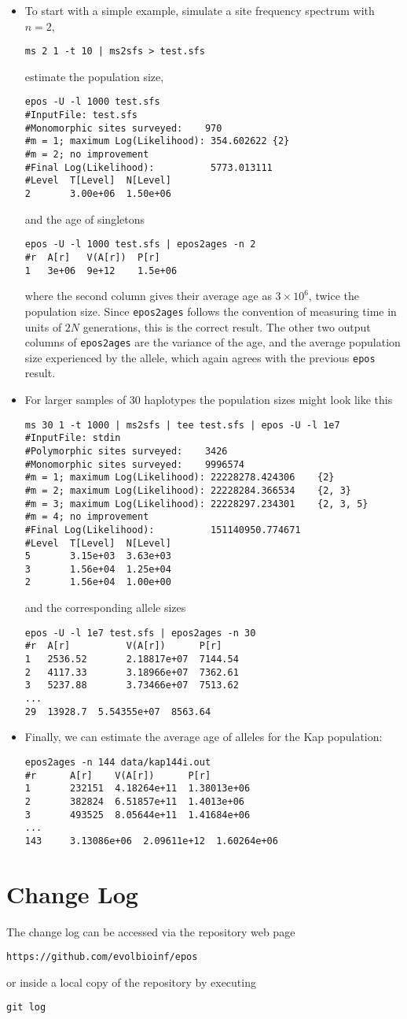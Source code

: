 \documentclass[a4paper, english]{article}
\newcommand{\ty}{\texttt}
\begin{document}
\begin{itemize}
  \item To start with a simple example, simulate a site frequency spectrum with $n=2$,
\begin{verbatim}
ms 2 1 -t 10 | ms2sfs > test.sfs
\end{verbatim}
estimate the population size,
\begin{verbatim}
epos -U -l 1000 test.sfs
#InputFile:	test.sfs
#Monomorphic sites surveyed:	970
#m = 1; maximum Log(Likelihood): 354.602622	{2}
#m = 2; no improvement
#Final Log(Likelihood):          5773.013111
#Level  T[Level]  N[Level]
2       3.00e+06  1.50e+06
\end{verbatim}
and the age of singletons
\begin{verbatim}
epos -U -l 1000 test.sfs | epos2ages -n 2
#r  A[r]   V(A[r])  P[r]
1   3e+06  9e+12    1.5e+06
\end{verbatim}
where the second column gives their average age as $3\times 10^6$,
twice the population size. Since \ty{epos2ages} follows the convention
of measuring time in units of $2N$ generations, this is the correct
result. The other two output columns of \ty{epos2ages} are the
variance of the age, and the average population size experienced by
the allele, which again agrees with the previous \ty{epos} result.
\item For larger samples of 30 haplotypes the population sizes might look like this
\begin{verbatim}
ms 30 1 -t 1000 | ms2sfs | tee test.sfs | epos -U -l 1e7
#InputFile:	stdin
#Polymorphic sites surveyed:	3426
#Monomorphic sites surveyed:	9996574
#m = 1; maximum Log(Likelihood): 22228278.424306	{2}
#m = 2; maximum Log(Likelihood): 22228284.366534	{2, 3}
#m = 3; maximum Log(Likelihood): 22228297.234301	{2, 3, 5}
#m = 4; no improvement
#Final Log(Likelihood):          151140950.774671
#Level  T[Level]  N[Level]
5       3.15e+03  3.63e+03
3       1.56e+04  1.25e+04
2       1.56e+04  1.00e+00
\end{verbatim}
and the corresponding allele sizes
\begin{verbatim}
epos -U -l 1e7 test.sfs | epos2ages -n 30
#r  A[r]          V(A[r])      P[r]
1   2536.52       2.18817e+07  7144.54
2   4117.33       3.18966e+07  7362.61
3   5237.88       3.73466e+07  7513.62
...
29  13928.7  5.54355e+07  8563.64
\end{verbatim}
\item Finally, we can estimate the average age of alleles for the Kap
  population:
\begin{verbatim}
epos2ages -n 144 data/kap144i.out
#r      A[r]    V(A[r])      P[r]
1       232151  4.18264e+11  1.38013e+06
2       382824  6.51857e+11  1.4013e+06
3       493525  8.05644e+11  1.41684e+06
...
143     3.13086e+06  2.09611e+12  1.60264e+06
\end{verbatim}  
\end{itemize}

\section{Change Log}
The change log can be accessed via the repository web page
\begin{verbatim}
https://github.com/evolbioinf/epos
\end{verbatim}
or inside a local copy of the repository by executing
\begin{verbatim}
git log
\end{verbatim}


\end{document}

